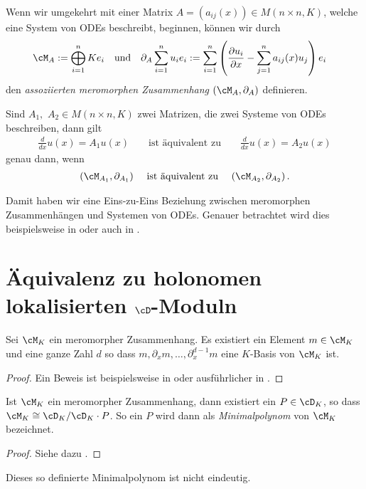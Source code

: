 \begin{defn}
Wenn wir umgekehrt mit einer Matrix $A=(a_{ij}(x))\in M(n\times n,K)$,
welche eine System von ODEs beschreibt, beginnen, können wir durch
\begin{align*}
\cM_A & :=\bigoplus_{i=1}^n Ke_i &&\text{und}
& \partial_A \sum_{i=1}^n u_ie_i &:= \sum_{i=1}^n\left(
  \frac{\partial u_i}{\partial x}-\sum_{j=1}^na_{ij}(x)u_j \right)e_i
\end{align*}
den \emph{assoziierten meromorphen Zusammenhang} $(\cM_A,\partial_A)$ definieren.
\end{defn}
\begin{comment}
TODO: zueinander inverse bijektionen?
\end{comment}
\begin{lem}
Sind $A_1,$ $A_2\in M(n\times n,K)$ zwei Matrizen, die zwei Systeme von ODEs
beschreiben, dann gilt
\begin{align*}
\frac{d}{dx}u(x)=A_1u(x) && \text{ ist äquivalent zu }
  && \frac{d}{dx}u(x)=A_2u(x)
\end{align*}
genau dann, wenn
\begin{align*}
(\cM_{A_1},\partial_{A_1}) && \text{ ist äquivalent zu }
  && (\cM_{A_2},\partial_{A_2}) \,.
\end{align*}
\end{lem}
Damit haben wir eine Eins-zu-Eins Beziehung zwischen meromorphen
Zusammenhängen und Systemen von ODEs.
Genauer betrachtet wird dies beispielsweise in \cite[Sec 5.1]{hotta2007d} oder
auch in \cite[Sec 3]{sabbah_cimpa90}.

\section{Äquivalenz zu holonomen lokalisierten $\cD$-Moduln}

\begin{lem} \label{lem:Zyklischer-Vektor}
Sei $\cM_K$ ein meromorpher Zusammenhang. Es existiert ein Element
$m\in\cM_K$ und eine ganze Zahl $d$ so dass
$m,\partial_xm,\dots,\partial_x^{d-1}m$ eine $K$-Basis von $\cM_K$ ist.
\end{lem}

\begin{proof}
Ein Beweis ist beispielsweise in \cite[Thm 4.3.3]{sabbah_cimpa90} oder
ausführlicher in \cite[Satz 4.8]{ZulaBarbara}.
\end{proof}
\begin{lemdef}
Ist $\cM_K$ ein meromorpher Zusammenhang, dann existiert ein $P\in\cD_K$, so
dass $\cM_K\cong\cD_K/\cD_K\cdot P$. So ein $P$ wird dann als
\emph{Minimalpolynom} von $\cM_K$ bezeichnet.
\end{lemdef}
\begin{proof}
Siehe dazu \cite[Satz 4.12]{ZulaBarbara}.
\begin{comment}
\cite[Thm 4.3.2]{sabbah_cimpa90}
\end{comment}
\end{proof}
\begin{bem}
Dieses so definierte Minimalpolynom ist nicht eindeutig.
\end{bem}

